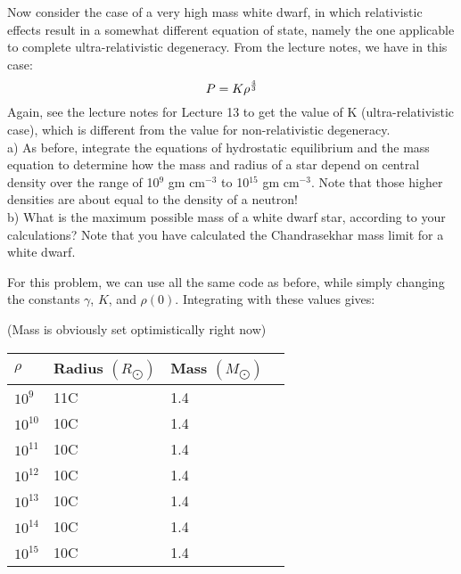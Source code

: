 \documentclass[12pt]{article}
\newenvironment{problem}[2][Problem]{\begin{trivlist}
\item[\hskip \labelsep {\bfseries #1}\hskip \labelsep {\bfseries #2.}]}{\end{trivlist}}
\newenvironment{answer}[2][Answer]{\begin{trivlist}
\item[\hskip \labelsep {\bfseries #1}\hskip \labelsep {\bfseries #2.}]}{\end{trivlist}}
\begin{document}
\begin{problem}{2} Now consider the case of a very high mass white dwarf, in which relativistic effects result in a somewhat different equation of state, namely the one applicable to complete ultra-relativistic degeneracy. From the lecture notes, we have in this case:
$$  P = K \rho^{4 \over 3}$$
Again, see the lecture notes for Lecture 13 to get the value of K (ultra-relativistic case), which is different from the value for non-relativistic degeneracy. \\

a) As before, integrate the equations of hydrostatic equilibrium and the mass equation to determine how the mass and radius of a star
depend on central density over the range of 10$^9$ gm cm$^{-3}$ to 10$^{15}$ gm cm$^{-3}$. Note that those higher densities are about equal to the density of a neutron! \\

b) What is the maximum possible mass of a white dwarf star, according to your calculations? Note that you have calculated the Chandrasekhar mass limit for a white dwarf.
\end{problem}



\begin{answer}{2}

For this problem, we can use all the same code as before, while simply changing the constants $\gamma$, $K$, and $\rho(0)$. Integrating with these values gives:

\bigskip
(Mass is obviously set optimistically right now)
\begin{center}
    \begin{tabular}{ | l | l | l | p{5cm} |}
    \hline
    $\rho$  & Radius $(R_{\bigodot})$ & Mass $(M_{\bigodot})$\\ \hline
    $10^9$  & 11C                     & 1.4 \\ \hline
    $10^10$ & 10C                     & 1.4 \\ \hline
    $10^11$ & 10C                     & 1.4 \\ \hline
    $10^12$ & 10C                     & 1.4 \\ \hline
    $10^13$ & 10C                     & 1.4 \\ \hline
    $10^14$ & 10C                     & 1.4 \\ \hline
    $10^15$ & 10C                     & 1.4 \\ \hline
    \end{tabular}
\end{center}


\bigskip
\bigskip


\end{answer}
\end{document}
